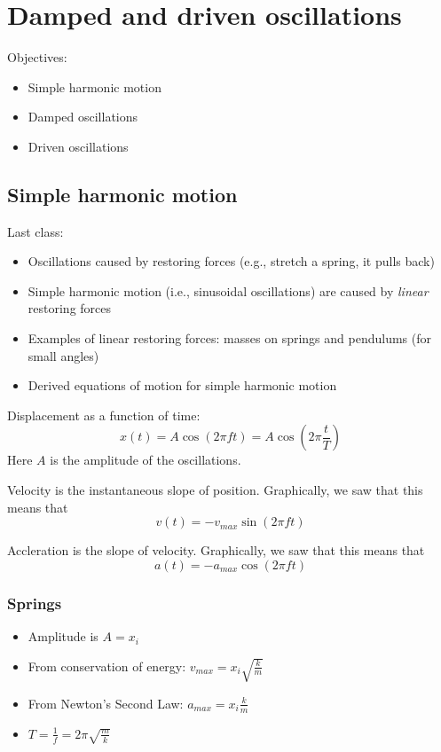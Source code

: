 \section{Damped and driven oscillations}
Objectives:
\begin{itemize}
  \item Simple harmonic motion
  \item Damped oscillations
  \item Driven oscillations
\end{itemize}

\subsection{Simple harmonic motion}
Last class:
\begin{itemize}
\item Oscillations caused by restoring forces (e.g., stretch a spring, it pulls back)
\item Simple harmonic motion (i.e., sinusoidal oscillations) are caused by \textit{linear} restoring forces
\item Examples of linear restoring forces: masses on springs and pendulums (for small angles)
\item Derived equations of motion for simple harmonic motion
\end{itemize}

Displacement as a function of time:
$$x(t)=A\cos(2\pi ft)=A\cos\left(2\pi\frac{t}{T}\right)$$ 
Here $A$ is the amplitude of the oscillations.

Velocity is the instantaneous slope of position. Graphically, we saw that this means that
$$v(t)=-v_{max}\sin(2\pi ft)$$

Accleration is the slope of velocity. Graphically, we saw that this means that
$$a(t)=-a_{max}\cos(2\pi ft)$$

\subsubsection{Springs}
\begin{itemize}
\item Amplitude is $A=x_i$  
\item From conservation of energy: $v_{max}=x_i\sqrt{\frac{k}{m}}$
\item From Newton's Second Law: $a_{max}=x_i\frac{k}{m}$
\item $T=\frac{1}{f}=2\pi\sqrt{\frac{m}{k}}$
\end{itemize}

